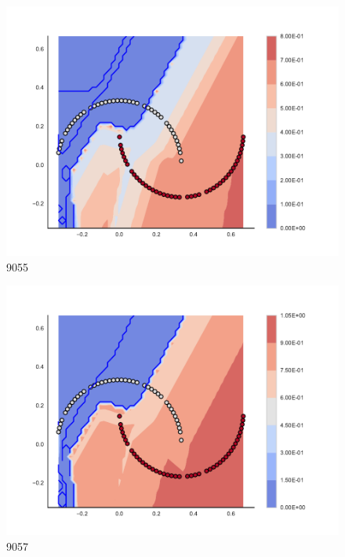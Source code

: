 \begin{subfigure}[b]{0.09\textwidth}
    \includegraphics[clip, trim=2.35cm 1.75cm 4.5cm 0cm,width=\textwidth]{img/convergence/9055.pdf}
    \caption{9055}
    \label{fig:convergence_9055}
\end{subfigure}
%
\begin{subfigure}[b]{0.09\textwidth}
    \includegraphics[clip, trim=2.35cm 1.75cm 4.5cm 0cm,width=\textwidth]{img/convergence/9057.pdf}
    \caption{9057}
    \label{fig:convergence_9057}
\end{subfigure}
%
